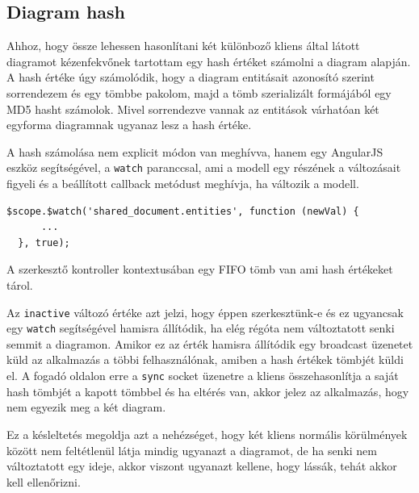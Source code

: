 \label{subsec:hashref}
\subsection{Diagram hash}

Ahhoz, hogy össze lehessen hasonlítani két különboző kliens által látott diagramot kézenfekvőnek tartottam egy hash értéket számolni a diagram alapján. A hash értéke úgy számolódik, hogy a diagram entitásait azonosító szerint sorrendezem és egy tömbbe pakolom, majd a tömb szerializált formájából egy MD5 hasht számolok. Mivel sorrendezve vannak az entitások várhatóan két egyforma diagramnak ugyanaz lesz a hash értéke.

A hash számolása nem explicit módon van meghívva, hanem egy AngularJS eszköz segítségével, a \lstinline{watch} paranccsal, ami a modell egy részének a változásait figyeli és a beállított callback metódust meghívja, ha változik a modell.

\begin{lstlisting}[caption=Modell módosításaira meghívódó callback]
  $scope.$watch('shared_document.entities', function (newVal) {
      ...
  }, true);
\end{lstlisting}

A szerkesztő kontroller kontextusában egy FIFO tömb van ami hash értékeket tárol.

Az \lstinline{inactive} változó értéke azt jelzi, hogy éppen szerkesztünk-e és ez ugyancsak egy \lstinline{watch} segítségével hamisra állítódik, ha elég régóta nem változtatott senki semmit a diagramon. Amikor ez az érték hamisra állítódik egy broadcast üzenetet küld az alkalmazás a többi felhasználónak, amiben a hash értékek tömbjét küldi el. A fogadó oldalon erre a \lstinline{sync} socket üzenetre a kliens összehasonlítja a saját hash tömbjét a kapott tömbbel és ha eltérés van, akkor jelez az alkalmazás, hogy nem egyezik meg a két diagram.

Ez a késleltetés megoldja azt a nehézséget, hogy két kliens normális körülmények között nem feltétlenül látja mindig ugyanazt a diagramot, de ha senki nem változtatott egy ideje, akkor viszont ugyanazt kellene, hogy lássák, tehát akkor kell ellenőrizni.









